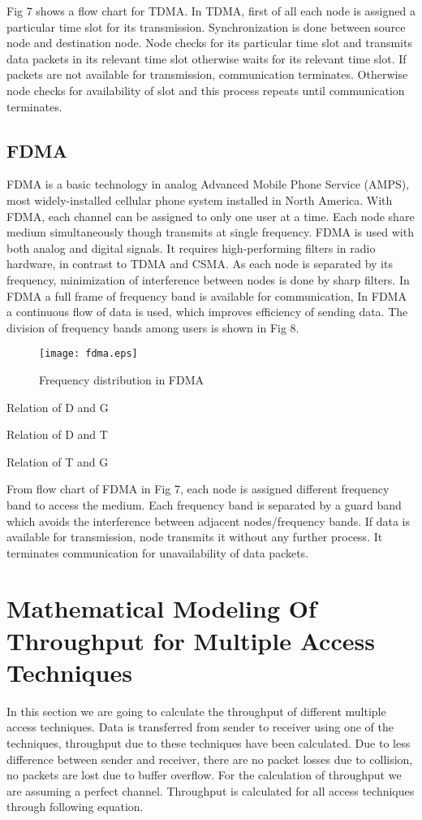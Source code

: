 \documentclass[11pt, conference, compsocconf, onecolumn]{IEEEtran}
\begin{document}
Fig 7 shows a flow chart for TDMA. In TDMA, first of all each node is assigned a particular time slot for its transmission. Synchronization is done between source node and destination node. Node checks for its particular time slot and transmits data packets in its relevant time slot otherwise waits for its relevant time slot. If packets are not available for transmission, communication terminates.  Otherwise node checks for availability of slot and this process repeats until communication terminates.

\subsection{FDMA}
FDMA is a basic technology in analog Advanced Mobile Phone Service (AMPS), most widely-installed cellular phone system installed in North America. With FDMA, each channel can be assigned to only one user at a time.
Each node share medium simultaneously though transmits at single frequency. FDMA is used with both analog and digital signals. It requires high-performing filters in radio hardware, in contrast to TDMA and CSMA. As each node is separated by its frequency, minimization of interference between nodes is done by sharp filters. In FDMA a full frame of frequency band is available for communication, In FDMA a continuous flow of data is used, which improves efficiency of sending data. The division of frequency bands among users is shown in Fig 8.
\begin{figure}[!h]
\centering
\caption{Frequency distribution in FDMA}
\texttt{[image: fdma.eps]}
\end{figure}
Relation of D and G

Relation of D and T

Relation of T and G

From flow chart of FDMA in Fig 7, each node is assigned different frequency band to access the medium. Each frequency band is separated by a guard band which avoids the interference between adjacent nodes/frequency bands. If data is available for transmission, node transmits it without any further process. It terminates communication for unavailability of data packets.

\section{Mathematical Modeling Of Throughput for Multiple Access Techniques}
In this section we are going to calculate the throughput of different multiple access techniques. Data is transferred from sender to receiver using one of the techniques, throughput due to these techniques have been calculated. Due to less difference between sender and receiver, there are no packet losses due to collision, no packets are lost due to buffer overflow. For the calculation of throughput we are assuming a perfect channel. Throughput is calculated for all access techniques through following equation.
\end{document}
